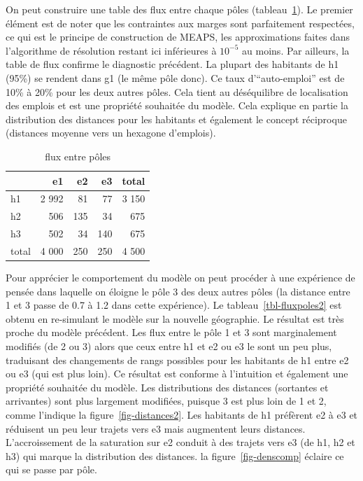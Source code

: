 \documentclass[
  10pt,
  a4paper,
  numbers=noendperiod,
  DIV=12]{scrartcl}
\begin{document}
On peut construire une table des flux entre chaque pôles
(tableau~\ref{tbl-fluxpoles}). Le premier élément est de noter que les
contraintes aux marges sont parfaitement respectées, ce qui est le
principe de construction de MEAPS, les approximations faites dans
l'algorithme de résolution restant ici inférieures à \(10^{-5}\) au
moins. Par ailleurs, la table de flux confirme le diagnostic précédent.
La plupart des habitants de h1 (95\%) se rendent dans g1 (le même pôle
donc). Ce taux d'``auto-emploi'' est de 10\% à 20\% pour les deux autres
pôles. Cela tient au déséquilibre de localisation des emplois et est une
propriété souhaitée du modèle. Cela explique en partie la distribution
des distances pour les habitants et également le concept réciproque
(distances moyenne vers un hexagone d'emplois).

\hypertarget{tbl-fluxpoles}{}
\begin{longtable}{lrrrr}
\caption{\label{tbl-fluxpoles}flux entre pôles }\tabularnewline

\toprule
 & e1 & e2 & e3 & total \\ 
\midrule
h1 & 2 992 & 81 & 77 & 3 150 \\ 
h2 & 506 & 135 & 34 & 675 \\ 
h3 & 502 & 34 & 140 & 675 \\ 
total & 4 000 & 250 & 250 & 4 500 \\ 
\bottomrule
\end{longtable}

Pour apprécier le comportement du modèle on peut procéder à une
expérience de pensée dans laquelle on éloigne le pôle 3 des deux autres
pôles (la distance entre 1 et 3 passe de 0.7 à 1.2 dans cette
expérience). Le tableau~\ref{tbl-fluxpoles2} est obtenu en re-simulant
le modèle sur la nouvelle géographie. Le résultat est très proche du
modèle précédent. Les flux entre le pôle 1 et 3 sont marginalement
modifiés (de 2 ou 3) alors que ceux entre h1 et e2 ou e3 le sont un peu
plus, traduisant des changements de rangs possibles pour les habitants
de h1 entre e2 ou e3 (qui est plus loin). Ce résultat est conforme à
l'intuition et également une propriété souhaitée du modèle. Les
distributions des distances (sortantes et arrivantes) sont plus
largement modifiées, puisque 3 est plus loin de 1 et 2, comme l'indique
la figure~\ref{fig-distances2}. Les habitants de h1 préfèrent e2 à e3 et
réduisent un peu leur trajets vers e3 mais augmentent leurs distances.
L'accroissement de la saturation sur e2 conduit à des trajets vers e3
(de h1, h2 et h3) qui marque la distribution des distances. la
figure~\ref{fig-denscomp} éclaire ce qui se passe par pôle.
\end{document}

